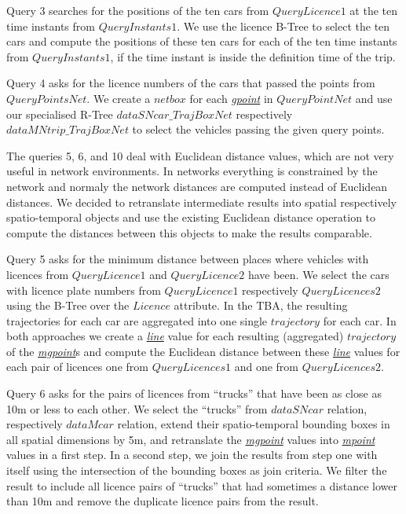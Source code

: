 \documentclass[a4paper]{article}
\newcommand{\dt}[1]{\textsl{\underline{#1}}}
\begin{document}
Query 3 searches for the positions of the ten cars from $QueryLicence1$ at the
ten time instants from $QueryInstants1$. We use the licence B-Tree to select the
ten cars and compute the positions of these ten cars for each of the ten time
instants from $QueryInstants1$, if the time instant is inside the definition time
of the trip.

Query 4 asks for the licence numbers of the cars that passed the points
from $QueryPointsNet$. We create a $netbox$ for each \dt{gpoint} in $QueryPointNet$
and use our specialised R-Tree $dataSNcar\_TrajBoxNet$ respectively
$dataMNtrip\_TrajBoxNet$ to select the vehicles passing the given query points.

The queries 5, 6, and 10 deal with Euclidean distance values, which are not very
useful in network environments. In networks everything is constrained by the
network and normaly the network distances are computed instead of Euclidean
distances. We decided to retranslate intermediate results
into spatial respectively spatio-temporal objects and use the existing
Euclidean distance operation to compute the distances between this objects to make
the results comparable.

Query 5 asks for the minimum distance between places where vehicles with
licences from $QueryLicence1$ and $QueryLicence2$ have been. We select the cars
with licence plate numbers from $QueryLicence1$ respectively $QueryLicences2$ using the
B-Tree over the $Licence$ attribute. In the TBA, the
resulting trajectories for each car are aggregated into one single $trajectory$
for each car. In both approaches we create a \dt{line} value for each resulting
(aggregated) $trajectory$ of the \dt{mgpoint}s and compute the Euclidean distance
between these \dt{line} values for each pair of licences one from $QueryLicences1$
and one from $QueryLicences2$.

Query 6 asks for the pairs of licences from ``trucks'' that have been as close as
10m or less to each other. We select the ``trucks'' from $dataSNcar$ relation,
respectively $dataMcar$ relation, extend their spatio-temporal
bounding boxes in all spatial dimensions by 5m, and retranslate the
\dt{mgpoint} values into \dt{mpoint} values in a first step. In a second step,
we join the results from step one with itself using the intersection of the bounding boxes as join criteria. We filter the result to include all licence pairs of
``trucks'' that had sometimes a distance lower than 10m and remove the duplicate
licence pairs from the result.
\end{document}
